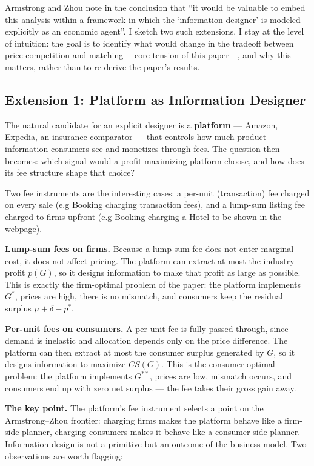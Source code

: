 \documentclass[12pt, a4paper]{article}
\begin{document}
Armstrong and Zhou note in the conclusion that ``it would be valuable to embed this analysis within a framework in which the `information designer' is modeled explicitly as an economic agent''. I sketch two such extensions. I stay at the level of intuition: the goal is to identify what would change in the tradeoff between price competition and matching ---core tension of this paper---, and why this matters, rather than to re-derive the paper's results.

\subsection{Extension 1: Platform as Information Designer}

The natural candidate for an explicit designer is a \textbf{platform} --- Amazon, Expedia, an insurance comparator --- that controls how much product information consumers see and monetizes through fees. The question then becomes: which signal would a profit-maximizing platform choose, and how does its fee structure shape that choice?

Two fee instruments are the interesting cases: a per-unit (transaction) fee charged on every sale (e.g Booking charging transaction fees), and a lump-sum listing fee charged to firms upfront (e.g Booking charging a Hotel to be shown in the webpage).

\textbf{Lump-sum fees on firms.} Because a lump-sum fee does not enter marginal cost, it does not affect pricing. The platform can extract at most the industry profit $p(G)$, so it designs information to make that profit as large as possible. This is exactly the firm-optimal problem of the paper: the platform implements $G^*$, prices are high, there is no mismatch, and consumers keep the residual surplus $\mu + \delta - p^*$.

\textbf{Per-unit fees on consumers.} A per-unit fee is fully passed through, since demand is inelastic and allocation depends only on the price difference. The platform can then extract at most the consumer surplus generated by $G$, so it designs information to maximize $CS(G)$. This is the consumer-optimal problem: the platform implements $G^{**}$, prices are low, mismatch occurs, and consumers end up with zero net surplus --- the fee takes their gross gain away.

\textbf{The key point.} The platform's fee instrument selects a point on the Armstrong--Zhou frontier: charging firms makes the platform behave like a firm-side planner, charging consumers makes it behave like a consumer-side planner. Information design is not a primitive but an outcome of the business model. Two observations are worth flagging:
\end{document}
